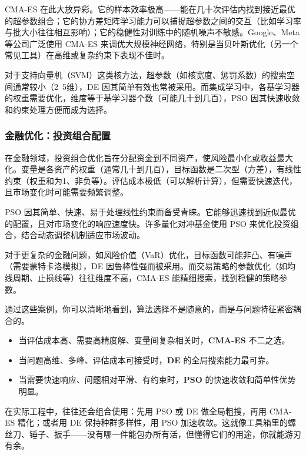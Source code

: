\documentclass[lang=cn,zihao=-4,a4paper,fontset=windows]{beautybook}
\begin{document}
CMA-ES 在此大放异彩。它的样本效率极高——能在几十次评估内找到接近最优的超参数组合；它的协方差矩阵学习能力可以捕捉超参数之间的交互（比如学习率与批大小往往相互影响）；它的稳健性对训练中的随机噪声不敏感。Google、Meta 等公司广泛使用 CMA-ES 来调优大规模神经网络，特别是当贝叶斯优化（另一个常见工具）在高维或复杂约束下表现不佳时。

对于支持向量机（SVM）这类核方法，超参数（如核宽度、惩罚系数）的搜索空间通常较小（2~5维），DE 因其简单有效也常被采用。而集成学习中，各基学习器的权重需要优化，维度等于基学习器个数（可能几十到几百），PSO 因其快速收敛和约束处理方便而成为选择。

\subsubsection{金融优化：投资组合配置}

在金融领域，投资组合优化旨在分配资金到不同资产，使风险最小化或收益最大化。变量是各资产的权重（通常几十到几百），目标函数是二次型（方差），有线性约束（权重和为1、非负等）。评估成本极低（可以解析计算），但需要快速迭代，且市场变化时可能需要频繁调整。

PSO 因其简单、快速、易于处理线性约束而备受青睐。它能够迅速找到近似最优的配置，且对市场变化的响应速度快。许多量化对冲基金使用 PSO 来优化投资组合，结合动态调整机制适应市场波动。

对于更复杂的金融问题，如风险价值（VaR）优化，目标函数可能非凸、有噪声（需要蒙特卡洛模拟），DE 因鲁棒性强而被采用。而交易策略的参数优化（如均线周期、止损线等）往往维度不高，CMA-ES 能精细搜索，找到稳健的策略参数。

\begin{fancybox}
通过这些案例，你可以清晰地看到，算法选择不是随意的，而是与问题特征紧密耦合的。
\begin{itemize}
    \item 当评估成本高、需要高精度解、变量间复杂相关时，\textbf{CMA-ES} 不二之选。
    \item 当问题高维、多峰、评估成本可接受时，\textbf{DE} 的全局搜索能力最可靠。
    \item 当需要快速响应、问题相对平滑、有约束时，\textbf{PSO} 的快速收敛和简单性优势明显。
\end{itemize}
\end{fancybox}

在实际工程中，往往还会组合使用：先用 PSO 或 DE 做全局粗搜，再用 CMA-ES 精化；或者用 DE 保持种群多样性，用 PSO 加速收敛。这就像工具箱里的螺丝刀、锤子、扳手——没有哪一件能包办所有活，但懂得它们的用途，你就能游刃有余。
\end{document}
